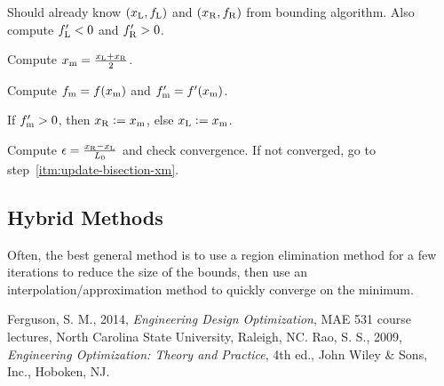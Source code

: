 \documentclass{article}
\begin{document}
\begin{enumerate*}
\setcounter{enumi}{-1}
\item Should already know \((x_{\mathrm{L}}, f_{\mathrm{L}})\) and \((x_{\mathrm{R}}, f_{\mathrm{R}})\) from bounding
  algorithm. Also compute \(f'_{\mathrm{L}} < 0\) and \(f'_{\mathrm{R}} > 0\).
\item \label{itm:update-bisection-xm} Compute \(x_{\mathrm{m}} = \frac{x_{\mathrm{L}} + x_{\mathrm{R}}}{2}\).
\item Compute \(f_{\mathrm{m}} = f(x_{\mathrm{m}})\) and \(f'_{\mathrm{m}} = f'(x_{\mathrm{m}})\).
\item If \(f'_{\mathrm{m}} > 0\), then \(x_{\mathrm{R}} := x_{\mathrm{m}}\), else \(x_{\mathrm{L}} := x_{\mathrm{m}}\).
\item Compute \(\epsilon = \frac{x_{\mathrm{R}} - x_{\mathrm{L}}}{L_0}\) and check convergence. If not
  converged, go to step~\ref{itm:update-bisection-xm}.
\end{enumerate*}

\subsection{Hybrid Methods}

Often, the best general method is to use a region elimination method for a few iterations to reduce
the size of the bounds, then use an interpolation\slash{}approximation method to quickly converge on
the minimum.

\begin{thebibliography}{99}
 Ferguson, S. M., 2014, \emph{Engineering Design Optimization}, MAE 531 course
  lectures, North Carolina State University, Raleigh, NC.
 Rao, S. S., 2009, \emph{Engineering Optimization: Theory and Practice}, 4th ed.,
  John Wiley \& Sons, Inc., Hoboken, NJ.
\end{thebibliography}
\end{document}

